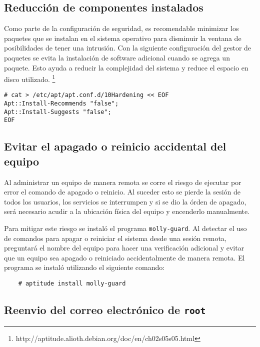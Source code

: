       \subsection {Reducci\'{o}n de componentes instalados}

Como parte de la configuraci\'{o}n de seguridad, es recomendable minimizar los paquetes que se instalan en el sistema operativo para disminuir la ventana de posibilidades de tener una intrusi\'{o}n. Con la siguiente configuraci\'{o}n del gestor de paquetes se evita la instalaci\'{o}n de software adicional cuando se agrega un paquete. Esto ayuda a reducir la complejidad del sistema y reduce el espacio en disco utilizado. \footnote{http://aptitude.alioth.debian.org/doc/en/ch02s05s05.html}

{
\scriptsize
\linespread{1}
\begin{verbatim}
# cat > /etc/apt/apt.conf.d/10Hardening << EOF
Apt::Install-Recommends "false";
Apt::Install-Suggests "false";
EOF

\end{verbatim}
}

      \subsection {Evitar el apagado o reinicio accidental del equipo}

Al administrar un equipo de manera remota se corre el riesgo de ejecutar por error el comando de apagado o reinicio. Al suceder esto se pierde la sesi\'{o}n de todos los usuarios, los servicios se interrumpen y si se dio la \'{o}rden de apagado, ser\'{a} necesario acudir a la ubicaci\'{o}n f\'{i}sica del equipo y encenderlo manualmente.

Para mitigar este riesgo se instal\'{o} el programa \texttt{molly-guard}. Al detectar el uso de comandos para apagar o reiniciar el sistema desde una sesi\'{o}n remota, preguntar\'{a} el nombre del equipo para hacer una verificaci\'{o}n adicional y evitar que un equipo sea apagado o reiniciado accidentalmente de manera remota. El programa se instal\'{o} utilizando el siguiente comando:

{
\scriptsize
\linespread{1}
\begin{verbatim}
    # aptitude install molly-guard
\end{verbatim}
}

      \subsection {Reenvio del correo electr\'{o}nico de \texttt{root}}

